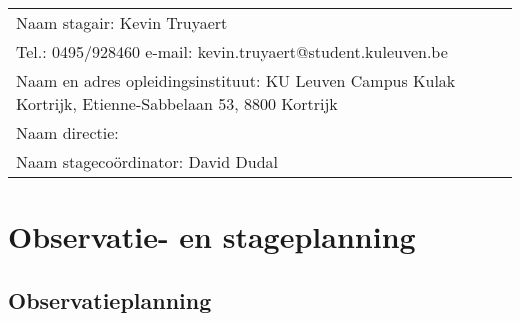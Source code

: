 
\begin{landscape}
	
	\begin{tabularx}{1.56\textwidth}{|X|}
		\hline
		Naam stagair:  Kevin Truyaert  \\
		Tel.: 0495/928460 \hspace{3cm} e-mail: kevin.truyaert@student.kuleuven.be  \\
		Naam en adres opleidingsinstituut:  KU Leuven Campus Kulak Kortrijk, Etienne-Sabbelaan 53, 8800 Kortrijk  \\
		Naam directie: \\
		Naam stagecoördinator:  David Dudal \\
		\hline
	\end{tabularx}
	\vspace*{-0.4cm}
\section{Observatie- en stageplanning}

\vspace*{-0.3cm}\subsection{Observatieplanning}


\end{landscape}
